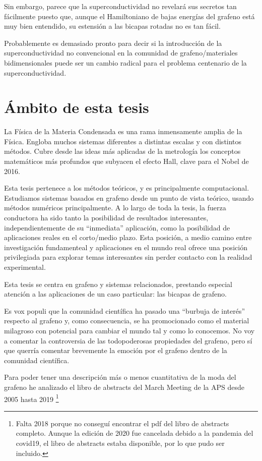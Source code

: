 Sin embargo, parece que la superconductividad no revelará sus secretos tan fácilmente puesto que, aunque el Hamiltoniano de bajas energías del grafeno está muy  bien entendido, su estensión a las bicapas rotadas no es tan fácil.

Probablemente es demasiado pronto para decir si la introducción de la superconductividad no convencional en la comunidad de grafeno/materiales bidimensionales puede ser un cambio radical para el problema centenario de la superconductividad.


\section{Ámbito de esta tesis}
La Física de la Materia Condensada es una rama inmensamente amplia de la Física. Engloba muchos sistemas diferentes a distintas escalas y con distintos métodos. Cubre desde las ideas más aplicadas de la metrología los conceptos matemáticos más profundos que subyacen el efecto Hall, clave para el Nobel de 2016.

Esta tesis pertenece a los métodos teóricos, y es principalmente computacional.
Estudiamos sistemas basados en grafeno desde un punto de vista teórico, usando métodos numéricos principalmente.
A lo largo de toda la tesis, la fuerza conductora ha sido tanto la posibilidad de resultados interesantes, independientemente de su ``inmediata'' aplicación, como la posibilidad de aplicaciones reales en el corto/medio plazo.
Esta posición, a medio camino entre investigación fundamenteal y aplicaciones en el mundo real ofrece una posición privilegiada para explorar temas interesantes sin perder contacto con la realidad experimental.
\bigskip

Esta tesis se centra en grafeno y sistemas relacionados, prestando especial atención a las aplicaciones de un caso particular: las bicapas de grafeno.

Es vox populi que la comunidad científica ha pasado una ``burbuja de interés'' respecto al grafeno y, como consecuencia, se ha promocionado como el material milagroso con potencial para cambiar el mundo tal y como lo conocemos. No voy a comentar la controversia de las todopoderosas propiedades del grafeno, pero sí que querría comentar brevemente la emoción por el grafeno dentro de la comunidad científica.
\smallskip

Para poder tener una descripción más o menos cuantitativa de la moda del grafeno he analizado el libro de abstracts del March Meeting de la APS desde 2005 hasta 2019 \footnote{Falta 2018 porque no conseguí encontrar el pdf del libro de abstracts completo. Aunque la edición de 2020 fue cancelada debido a la pandemia del covid19, el libro de abstracts estaba disponible, por lo que pudo ser incluido.}

